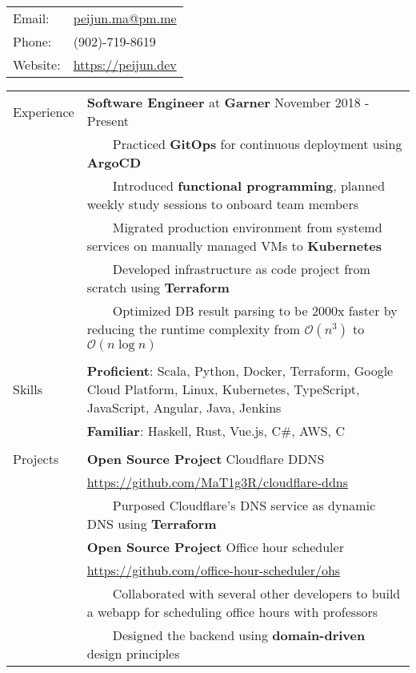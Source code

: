 \documentclass[letterpaper,12pt,oneside]{article}
\newcommand{\tabitem}{~~\llap{\textbullet}~~}
\newcommand{\smallurl}[1]{\scriptsize{\url{#1}}}
\begin{document}
\begin{tabular}{l l}
    Email: & \href{mailto:peijun.ma@pm.me}{peijun.ma@pm.me} \\
    Phone: & (902)-719-8619 \\
    Website: & \href{https://peijun.dev}{https://peijun.dev}
\end{tabular}


\noindent \begin{longtable}{@{} l p{14cm}}
\Large{Experience}
& \textbf{Software Engineer} at \textbf{Garner} \hspace*{\fill} November 2018 - Present \\
& \tabitem Practiced \textbf{GitOps} for continuous deployment using \textbf{ArgoCD} \\
& \tabitem Introduced \textbf{functional programming}, planned weekly study sessions to onboard team members \\
& \tabitem Migrated production environment from systemd services on manually managed VMs to \textbf{Kubernetes} \\
& \tabitem Developed infrastructure as code project from scratch using \textbf{Terraform} \\
& \tabitem Optimized DB result parsing to be 2000x faster by reducing the runtime complexity from $\mathcal{O}(n^3)$ to $\mathcal{O}(n\log{}n)$ \\
& \\
\Large{Skills}
& \textbf{Proficient}: Scala, Python, Docker, Terraform, Google Cloud Platform, Linux, Kubernetes, TypeScript, JavaScript, Angular, Java, Jenkins \\
& \textbf{Familiar}: Haskell, Rust, Vue.js, C\#, AWS, C \\
& \\
\Large{Projects}
& \textbf{Open Source Project} Cloudflare DDNS \\
& \smallurl{https://github.com/MaT1g3R/cloudflare-ddns} \\
& \tabitem Purposed Cloudflare's DNS service as dynamic DNS using \textbf{Terraform} \\
& \textbf{Open Source Project} Office hour scheduler \\
& \smallurl{https://github.com/office-hour-scheduler/ohs} \\
& \tabitem Collaborated with several other developers to build a webapp for scheduling office hours with professors \\
& \tabitem Designed the backend using \textbf{domain-driven} design principles \\

\end{longtable}
\end{document}

